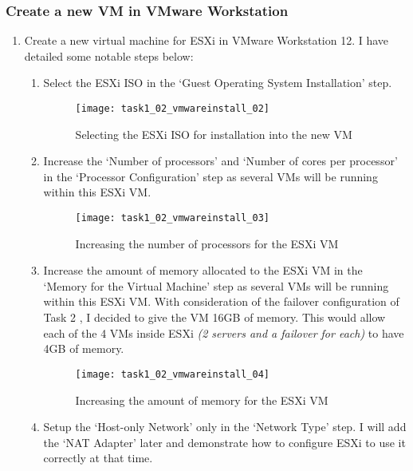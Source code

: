 \subsubsection{Create a new VM in VMware Workstation}
\begin{enumerate}[resume*=task1methodology]
  \item Create a new virtual machine for ESXi in VMware Workstation 12. I have detailed some notable steps below:
    \begin{enumerate}[label=(\alph*)]
      \item Select the ESXi ISO in the `Guest Operating System Installation' step.
        \begin{figure}[H]
          \centering
          \captionsetup{skip=2pt}
          \texttt{[image: task1\_02\_vmwareinstall\_02]}
          \caption{Selecting the ESXi ISO for installation into the new VM}
          \label{fig:task1:02_vmwarewiz_02}
        \end{figure}
      \item Increase the `Number of processors' and `Number of cores per processor' in the `Processor Configuration' step as several VMs will be running within this ESXi VM.
        \begin{figure}[H]
          \centering
          \captionsetup{skip=2pt}
          \texttt{[image: task1\_02\_vmwareinstall\_03]}
          \caption{Increasing the number of processors for the ESXi VM}
          \label{fig:task1:02_vmwarewiz_03}
        \end{figure}
      \item Increase the amount of memory allocated to the ESXi VM in the `Memory for the Virtual Machine' step as several VMs will be running within this ESXi VM. With consideration of the failover configuration of Task 2 , I decided to give the VM 16GB of memory. This would allow each of the 4 VMs inside ESXi \textit{(2 servers and a failover for each)} to have 4GB of memory.
        \begin{figure}[H]
          \centering
          \captionsetup{skip=2pt}
          \texttt{[image: task1\_02\_vmwareinstall\_04]}
          \caption{Increasing the amount of memory for the ESXi VM}
          \label{fig:task1:02_vmwarewiz_04}
        \end{figure}
      \item Setup the `Host-only Network' only in the `Network Type' step. I will add the `NAT Adapter' later and demonstrate how to configure ESXi to use it correctly at that time.

\end{enumerate}
\end{enumerate}

